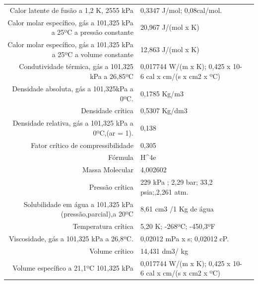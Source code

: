\begin{table}[h]
\begin{tabular}{r|lr}
Calor latente de fusão a 1,2 K, 2555 kPa & 0,3347 J/mol; 0,08cal/mol.\\
Calor molar específico, gás a 101,325 kPa a 25ºC a pressão constante & 20,967 J/(mol x K) \\ 
Calor molar específico, gás a 101,325 kPa a 25ºC a volume constante  & 12,863 J/(mol x K)                                       \\
Condutividade térmica, gás a 101,325 kPa a 26,85ºC                   & 0,017744 W/(m x K); 0,425 x 10-6 cal x cm/(s x cm2 x ºC) \\
Densidade absoluta, gás a 101,325kPa a 0ºC.                          & 0,1785 Kg/m3                                             \\
Densidade crítica                                                    & 0,5307 Kg/dm3                                            \\
Densidade relativa, gás a 101,325 kPa a 0ºC,(ar = 1).                & 0,138                                                    \\
Fator crítico de compressibilidade                                   & 0,305                                                    \\
Fórmula                                                              & H^4e                                                      \\
Massa Molecular                                                      & 4,002602                                                 \\
Pressão crítica                                                      & 229 kPa ; 2,29 bar; 33,2 psia;,2,261 atm.                \\
Solubilidade em água a 101,325 kPa (pressão,parcial),a 20ºC          & 8,61 cm3 /1 Kg de água                                   \\
Temperatura crítica                                                  & 5,20 K; -268ºC; -450,3ºF                                 \\
Viscosidade, gás a 101,325 kPa a 26,8ºC.                             & 0,02012 mPa x s; 0,02012 cP.                             \\
Volume crítico                                                       & 14,431 dm3/ kg                                           \\
Volume específico a 21,1ºC 101,325 kPa                               & 0,017744 W/(m x K); 0,425 x 10-6 cal x cm/(s x cm2 x ºC)
\hline
\end{tabular}
\end{table}

